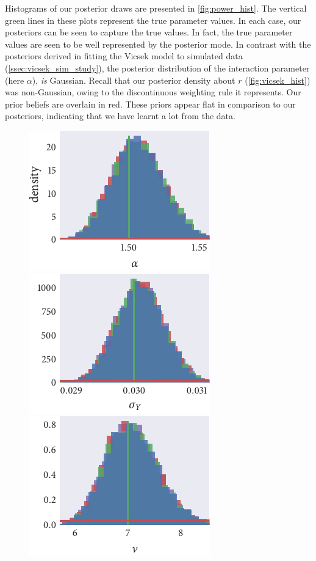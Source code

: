 Histograms of our posterior draws are presented in \cref{fig:power_hist}. The
vertical green lines in these plots represent the true parameter values. In
each case, our posteriors can be seen to capture the true values. In fact, the
true parameter values are seen to be well represented by the posterior mode. In
contrast with the posteriors derived in fitting the Vicsek model to simulated
data (\cref{ssec:vicsek_sim_study}), the posterior distribution of the
interaction parameter (here $\alpha$), \emph{is} Gaussian. Recall that our
posterior density about $r$ (\cref{fig:vicsek_hist}) was non-Gaussian, owing to
the discontinuous weighting rule it represents. Our prior beliefs are overlain
in red. These priors appear flat in comparison to our posteriors, indicating
that we have learnt a lot from the data.

\begin{figure}[tbp]
  \includegraphics{power/power_hist_alpha.pdf}%
  \includegraphics{power/power_hist_sigma_Y.pdf}%
  \includegraphics{power/power_hist_nu.pdf}

\end{figure}
